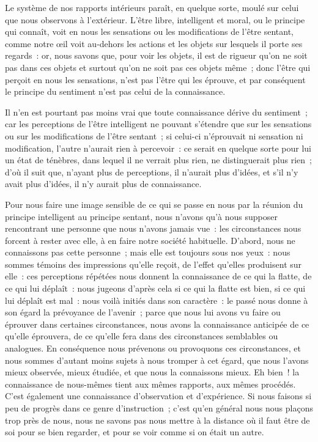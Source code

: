 \documentclass[french,twoside]{book} %
\begin{document}
Le système de nos rapports intérieurs paraît, en quelque sorte, moulé sur celui que nous observons à l’extérieur. L’être libre, intelligent et moral, ou le principe qui connaît, voit en nous les sensations ou les modifications de l’être sentant, comme notre œil voit au-dehors les actions et les objets sur lesquels il porte ses regards : or, nous savons que, pour voir les objets, il est de rigueur qu’on ne soit pas dans ces objets et surtout qu’on ne soit pas ces objets même ; donc l’être qui perçoit en nous les sensations, n’est pas l’être qui les éprouve, et par conséquent le principe du sentiment n’est pas celui de la connaissance.\par
Il n’en est pourtant pas moins vrai que toute connaissance dérive du sentiment ; car les perceptions de l’être intelligent ne pouvant s’étendre que sur les sensations ou sur les modifications de l’être sentant ; si celui-ci n’éprouvait ni sensation ni modification, l’autre n’aurait rien à percevoir : ce serait en quelque sorte pour lui un état de ténèbres, dans lequel il ne verrait plus rien, ne distinguerait plus rien ; d’où il suit que, n’ayant plus de perceptions, il n’aurait plus d’idées, et s’il n’y avait plus d’idées, il n’y aurait plus de connaissance.\par
Pour nous faire une image sensible de ce qui se passe en nous par la réunion du principe intelligent au principe sentant, nous n’avons qu’à nous supposer rencontrant une personne que nous n’avons jamais vue : les circonstances nous forcent à rester avec elle, à en faire notre société habituelle. D’abord, nous ne connaissons pas cette personne ; mais elle est toujours sous nos yeux : nous sommes témoins des impressions qu’elle reçoit, de l’effet qu’elles produisent sur elle : ces perceptions répétées nous donnent la connaissance de ce qui la flatte, de ce qui lui déplaît : nous jugeons d’après cela si ce qui la flatte est bien, si ce qui lui déplaît est mal : nous voilà initiés dans son caractère : le passé nous donne à son égard la prévoyance de l’avenir ; parce que nous lui avons vu faire ou éprouver dans certaines circonstances, nous avons la connaissance anticipée de ce qu’elle éprouvera, de ce qu’elle fera dans des circonstances semblables ou analogues. En conséquence nous prévenons ou provoquons ces circonstances, et nous sommes d’autant moins sujets à nous tromper à cet égard, que nous l’avons mieux observée, mieux étudiée, et que nous la connaissons mieux. Eh bien ! la connaissance de nous-mêmes tient aux mêmes rapports, aux mêmes procédés. C’est également une connaissance d’observation et d’expérience. Si nous faisons si peu de progrès dans ce genre d’instruction ; c’est qu’en général nous nous plaçons trop près de nous, nous ne savons pas nous mettre à la distance où il faut être de soi pour se bien regarder, et pour se voir comme si on était un autre.\par
\end{document}

